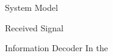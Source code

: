 \documentclass{IEEEtran}
\begin{document}
\begin{section} {System Model}
\begin{subsection}	{Received Signal}
	\end{subsection}

	\begin{subsection}	{Information Decoder}
		In the
	\end{subsection}
\end{section}



\end{document}

